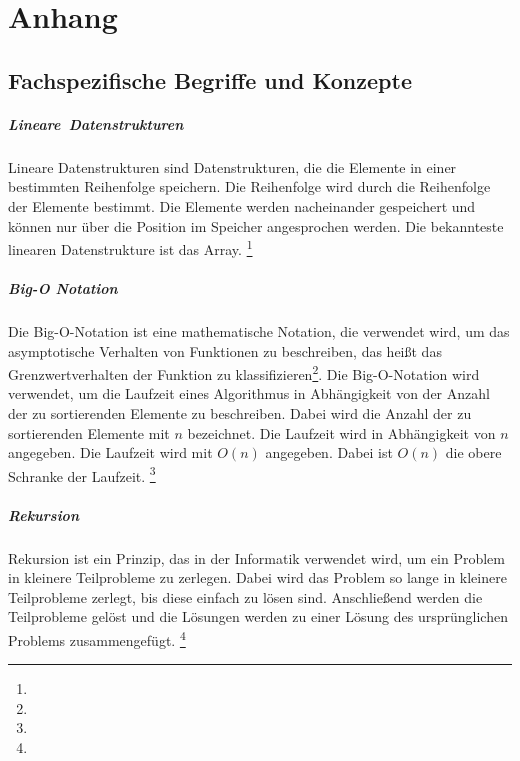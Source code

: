 \documentclass[./entry.tex]{subfiles}
\begin{document}
    \chapter{Anhang}

    \section{Fachspezifische Begriffe und Konzepte}

    \paragraph{Lineare\ Datenstrukturen}
    Lineare Datenstrukturen sind Datenstrukturen, die die Elemente in einer bestimmten Reihenfolge speichern. Die
    Reihenfolge wird durch die Reihenfolge der Elemente bestimmt. Die Elemente werden nacheinander gespeichert und
    können nur über die Position im Speicher angesprochen werden. Die bekannteste linearen Datenstrukture ist
    das Array.
    \footnote{}

    \paragraph{Big-O Notation}
    Die Big-O-Notation ist eine mathematische Notation, die verwendet wird, um das asymptotische Verhalten von
    Funktionen zu beschreiben, das heißt das Grenzwertverhalten der Funktion zu klassifizieren\footnote{}.
    Die Big-O-Notation wird verwendet, um die Laufzeit eines Algorithmus in Abhängigkeit von der Anzahl der zu
    sortierenden Elemente zu beschreiben. Dabei wird die Anzahl der zu sortierenden Elemente mit $n$ bezeichnet.
    Die Laufzeit wird in Abhängigkeit von $n$ angegeben. Die Laufzeit wird mit $O(n)$ angegeben. Dabei ist $O(n)$
    die obere Schranke der Laufzeit.
    \footnote{}

    \paragraph{Rekursion}
    Rekursion ist ein Prinzip, das in der Informatik verwendet wird, um ein Problem in kleinere Teilprobleme zu
    zerlegen. Dabei wird das Problem so lange in kleinere Teilprobleme zerlegt, bis diese einfach zu lösen sind.
    Anschließend werden die Teilprobleme gelöst und die Lösungen werden zu einer Lösung des ursprünglichen Problems
    zusammengefügt.
    \footnote{}
\end{document}
